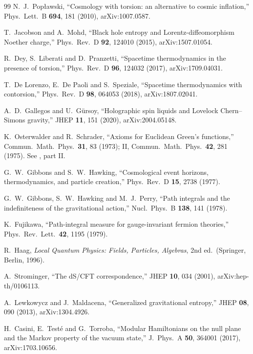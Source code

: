 \documentclass[11pt]{article}
\theoremstyle{definition}
\begin{document}
\begin{thebibliography}{99}
N.~J.~Pop\l awski, ``Cosmology with torsion: an alternative to cosmic
inflation,'' Phys.\ Lett.\ B \textbf{694}, 181 (2010), arXiv:1007.0587.

T.~Jacobson and A.~Mohd, ``Black hole entropy and Lorentz-diffeomorphism
Noether charge,'' Phys.\ Rev.\ D \textbf{92}, 124010 (2015),
arXiv:1507.01054.

R.~Dey, S.~Liberati and D.~Pranzetti, ``Spacetime thermodynamics in the
presence of torsion,'' Phys.\ Rev.\ D \textbf{96}, 124032 (2017),
arXiv:1709.04031.

T.~De Lorenzo, E.~De Paoli and S.~Speziale, ``Spacetime thermodynamics with
contorsion,'' Phys.\ Rev.\ D \textbf{98}, 064053 (2018), arXiv:1807.02041.

A.~D.~Gallegos and U.~G\"ursoy, ``Holographic spin liquids and Lovelock
Chern--Simons gravity,'' JHEP \textbf{11}, 151 (2020), arXiv:2004.05148.

K.~Osterwalder and R.~Schrader, ``Axioms for Euclidean Green's
functions,'' Commun.\ Math.\ Phys.\ \textbf{31}, 83 (1973); II,
Commun.\ Math.\ Phys.\ \textbf{42}, 281 (1975).
See \cite{OS1973}, part II.

G.~W.~Gibbons and S.~W.~Hawking, ``Cosmological event horizons,
thermodynamics, and particle creation,''
Phys.\ Rev.\ D \textbf{15}, 2738 (1977).

G.~W.~Gibbons, S.~W.~Hawking and M.~J.~Perry, ``Path integrals and the
indefiniteness of the gravitational action,''
Nucl.\ Phys.\ B \textbf{138}, 141 (1978).

K.~Fujikawa, ``Path-integral measure for gauge-invariant fermion
theories,'' Phys.\ Rev.\ Lett.\ \textbf{42}, 1195 (1979).

R.~Haag, \emph{Local Quantum Physics: Fields, Particles, Algebras},
2nd ed.\ (Springer, Berlin, 1996).

A.~Strominger, ``The dS/CFT correspondence,''
JHEP \textbf{10}, 034 (2001), arXiv:hep-th/0106113.

A.~Lewkowycz and J.~Maldacena, ``Generalized gravitational entropy,''
JHEP \textbf{08}, 090 (2013), arXiv:1304.4926.

H.~Casini, E.~Test\'e and G.~Torroba, ``Modular Hamiltonians on the null
plane and the Markov property of the vacuum state,''
J.\ Phys.\ A \textbf{50}, 364001 (2017), arXiv:1703.10656.


\end{thebibliography}
\end{document}
